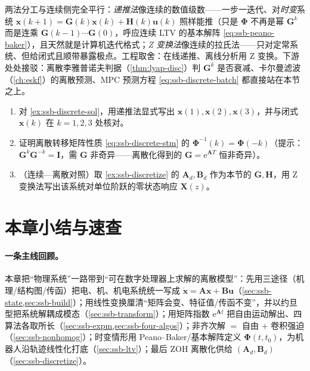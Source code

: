 \begin{insight}
两法分工与连续侧完全平行：\emph{递推法}像连续的数值级数——一步一迭代、对\emph{时变}系统 $\mathbf{x}(k{+}1)=\mathbf{G}(k)\mathbf{x}(k)+\mathbf{H}(k)\mathbf{u}(k)$ 照样能推（只是 $\boldsymbol{\Phi}$ 不再是幂 $\mathbf{G}^k$ 而是连乘 $\mathbf{G}(k{-}1)\cdots\mathbf{G}(0)$，呼应连续 LTV 的基本解阵 \cref{eq:ssb-peano-baker}），且天然就是计算机迭代格式；\emph{Z 变换法}像连续的拉氏法——只对定常系统、但给闭式且顺带暴露极点。工程取舍：在线递推、离线分析用 Z 变换。下游处处接驳：离散李雅普诺夫判据（\cref{thm:lyap-disc}）判 $\mathbf{G}^k$ 是否衰减、卡尔曼滤波（\cref{ch:eskf}）的离散预测、MPC 预测方程 \cref{eq:ssb-discrete-batch} 都直接站在本节之上。
\end{insight}

\begin{practice}
\begin{enumerate}
  \item 对 \cref{ex:ssb-discrete-sol}，用递推法显式写出 $\mathbf{x}(1),\mathbf{x}(2),\mathbf{x}(3)$，并与闭式 $\mathbf{x}(k)$ 在 $k=1,2,3$ 处核对。
  \item 证明离散转移矩阵性质 \cref{eq:ssb-discrete-stm} 的 $\boldsymbol{\Phi}^{-1}(k)=\boldsymbol{\Phi}(-k)$（提示：$\mathbf{G}^k\mathbf{G}^{-k}=\mathbf{I}$，需 $\mathbf{G}$ 非奇异——离散化得到的 $\mathbf{G}=\mathrm{e}^{\mathbf{A}T}$ 恒非奇异）。
  \item （连续—离散对照）取 \cref{ex:ssb-discretize} 的 $\mathbf{A}_d,\mathbf{B}_d$ 作为本节的 $\mathbf{G},\mathbf{H}$，用 Z 变换法写出该系统对单位阶跃的零状态响应 $\mathbf{X}(z)$。
\end{enumerate}
\end{practice}

\section{本章小结与速查}
\label{sec:ssb-summary}

\paragraph{一条主线回顾。}
本章把“物理系统”一路带到“可在数字处理器上求解的离散模型”：先用三途径（机理/结构图/传函）把电、机、机电系统统一写成 $\dot{\mathbf{x}}=\mathbf{A}\mathbf{x}+\mathbf{B}\mathbf{u}$（\cref{sec:ssb-state,sec:ssb-build}）；用线性变换厘清“矩阵会变、特征值/传函不变”，并以约旦型把系统解耦成模态（\cref{sec:ssb-transform}）；用矩阵指数 $\mathrm{e}^{\mathbf{A}t}$ 把自由运动解出、四算法各取所长（\cref{sec:ssb-expm,sec:ssb-four-algos}）；非齐次解 $=$ 自由 $+$ 卷积强迫（\cref{sec:ssb-nonhomog}）；时变情形用 Peano--Baker/基本解阵定义 $\boldsymbol{\Phi}(t,t_0)$，为机器人沿轨迹线性化打底（\cref{sec:ssb-ltv}）；最后 ZOH 离散化供给 $(\mathbf{A}_d,\mathbf{B}_d)$（\cref{sec:ssb-discretize}）。

